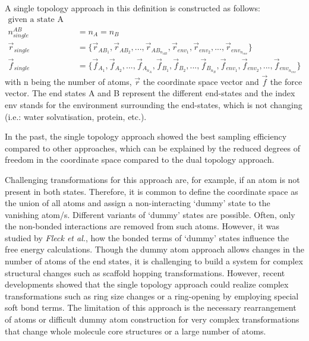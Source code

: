 A single topology approach in this definition is constructed as follows:
\begin{align*}
    \text{given a state A and B:}\\
    n_{single}^{AB} &= n_A = n_B\\
    \vec{r}_{single} &= \{\vec{r}_{AB_1}, \vec{r}_{AB_2}, ..., \vec{r}_{AB_{n_{AB}}}, \vec{r}_{env_1}, \vec{r}_{env_2}, ..., \vec{r}_{env_{n_{env}}}\}\\
    \vec{f}_{single} &= \{\vec{f}_{A_1}, \vec{f}_{A_2}, ..., \vec{f}_{A_{n_A}},\vec{f}_{B_1}, \vec{f}_{B_2}, ..., \vec{f}_{B_{n_B}}, \vec{f}_{env_1}, \vec{f}_{env_2}, ..., \vec{f}_{env_{n_{env}}}\}
\end{align*}
with n being the number of atoms, $\vec{r}$ the coordinate space vector and $\vec{f}$ the force vector. The end states A and B represent  the different end-states and the index env stands for the environment surrounding the end-states, which is not changing (i.e.: water solvatisation, protein, etc.).

In the past, the single topology approach showed the best sampling efficiency compared to other approaches, which can be explained by the reduced degrees of freedom in the coordinate space compared to the dual topology approach. \cite{Pearlman1994, Donnini2011, Yu2017, Fleck2021}

Challenging transformations for this approach are, for example, if an atom is not present in both states. Therefore, it is common to define the coordinate space as the union of all atoms and assign a non-interacting `dummy' state to the vanishing atom/s. \cite{Pearlman1994, Donnini2011, Yu2017, Fleck2021}
Different variants of `dummy' states are possible. Often, only the non-bonded interactions are removed from such atoms. However, it was studied by \textit{Fleck et al.}, how the bonded terms of `dummy' states influence the free energy calculations. \cite{Fleck2021}
Though the dummy atom approach allows changes in the number of atoms of the end states, it is challenging to build a system for complex structural changes such as scaffold hopping transformations.
However, recent developments showed that the single topology approach could realize complex transformations such as ring size changes or a ring-opening by employing special soft bond terms. The limitation of this approach is the necessary rearrangement of atoms or difficult dummy atom construction for very complex transformations that change whole molecule core structures or a large number of atoms.\cite{Wang2017} 


